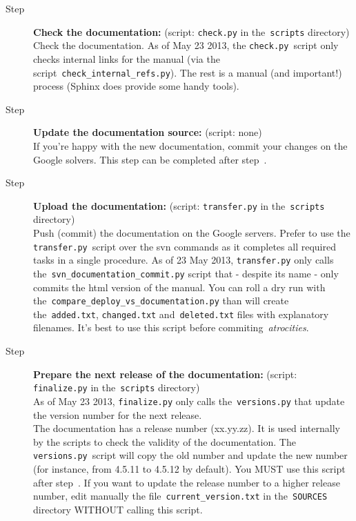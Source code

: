 \documentclass[a4paper,10pt]{article}
\newcommand{\code}[1]{\texttt{#1}}
\begin{document}
\begin{description}
 \item[Step \raisebox{.3pt}{\textcircled{\raisebox{-.9pt} {6}}}] {\bf Check the documentation:} (script: \code{check.py} in the~\code{scripts} directory)\\Check the documentation. As of May 23 2013, the \code{check.py}~script only checks internal links for the manual (via the script~\code{check\_internal\_refs.py}). The rest is a manual (and important!) process 
(Sphinx does provide some handy tools).

 \item[Step \raisebox{.3pt}{\textcircled{\raisebox{-.9pt} {7}}}] {\bf Update the documentation source:} (script: none)\\If you're happy with the new documentation, commit your changes on the Google solvers. This step can be completed after step~\raisebox{.3pt}{\textcircled{\raisebox{-.9pt} {9}}}.

 \item[Step \raisebox{.3pt}{\textcircled{\raisebox{-.9pt} {8}}}] {\bf Upload the documentation:} (script: \code{transfer.py} in the~\code{scripts} directory)\\Push (commit) the documentation on the Google servers. Prefer to use the \code{transfer.py}~script over the svn commands as it completes all required tasks in a single procedure. As of 23 May 2013, \code{transfer.py} only calls the~\code{svn\_documentation\_commit.py} script
that - despite its name - only commits the html version of the manual. You can roll a dry run with the~\code{compare\_deploy\_vs\_documentation.py} than will create the~\code{added.txt}, \code{changed.txt} and~\code{deleted.txt} files with explanatory filenames. It's best to use this script before commiting~\emph{atrocities}.

 \item[Step \raisebox{.3pt}{\textcircled{\raisebox{-.9pt} {9}}}] {\bf Prepare the next release of the documentation:} (script: \code{finalize.py} in the~\code{scripts} directory)\\As of May 23 2013, \code{finalize.py} only calls the~\code{versions.py} that update the version number for the next release.\\

The documentation has a release number (xx.yy.zz). It is used internally by the scripts to check the validity of the documentation. The \code{versions.py}~script will copy the old number and update the new number (for instance, from 4.5.11 to 4.5.12 by default). You MUST use this script after step~\raisebox{.3pt}{\textcircled{\raisebox{-.9pt} {8}}}. If you want to update the release number to a higher release number, edit manually the file~\code{current\_version.txt} in the~\code{SOURCES} directory WITHOUT calling this script.
\end{description}
\end{document}
